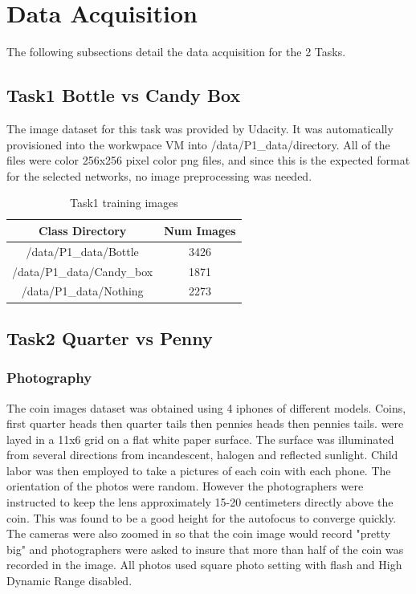 \documentclass[10pt,journal,compsoc]{IEEEtran}
\begin{document}
\section{Data Acquisition}
The following subsections detail the data acquisition for the 2 Tasks.

\subsection{Task1 Bottle vs Candy Box}
The image dataset for this task was provided by Udacity. It was automatically provisioned into the workwpace VM into 
/data/P1\_data/directory.
All of the files were color 256x256 pixel color png files, and since this is the expected format for the selected networks, no image preprocessing was needed.


\begin{table}[h]
\caption{Task1 training images}
\label{Task1 training images}
\begin{center}
\begin{tabular}{|c||c|}
\hline
Class Directory & Num Images\\
\hline
/data/P1\_data/Bottle & 3426\\
/data/P1\_data/Candy\_box & 1871\\
/data/P1\_data/Nothing & 2273 \\
\hline
\end{tabular}
\end{center}
\end{table}

\subsection{Task2 Quarter vs Penny}

\subsubsection{Photography}
The coin images dataset was obtained using 4 iphones of different models. Coins, first quarter heads then quarter tails then pennies heads then pennies tails. were layed in a 11x6 grid on a flat white paper surface. The surface was illuminated from several directions from incandescent, halogen and reflected sunlight. Child labor was then employed to take a pictures of each coin with each phone. The orientation of the photos were random. However the photographers were instructed to keep the lens approximately 15-20 centimeters directly above the coin. This was found to be a good height for the autofocus to converge quickly. The cameras were also zoomed in so that the coin image would record "pretty big" and photographers were asked to insure that more than half of the coin was recorded in the image. All photos used square photo setting with flash and High Dynamic Range disabled.
\end{document}
